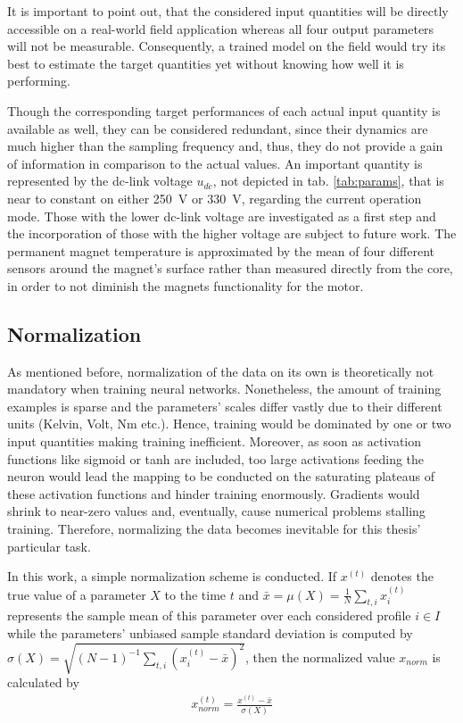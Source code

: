 It is important to point out, that the considered input quantities will be directly accessible on a real-world field application whereas all four output parameters will not be measurable.
Consequently, a trained model on the field would try its best to estimate the target quantities yet without knowing how well it is performing.

Though the corresponding target performances of each actual input quantity is available as well, they can be considered redundant, since their dynamics are much higher than the sampling frequency and, thus, they do not provide a gain of information in comparison to the actual values.
An important quantity is represented by the dc-link voltage $u_{dc}$, not depicted in tab. \ref{tab:params}, that is near to constant on either \SI{250}{\volt} or \SI{330}{\volt}, regarding the current operation mode.
Those with the lower dc-link voltage are investigated as a first step and the incorporation of those with the higher voltage are subject to future work.
The permanent magnet temperature is approximated by the mean of four different sensors around the magnet's surface rather than measured directly from the core, in order to not diminish the magnets functionality for the motor.


\subsection{Normalization}
As mentioned before, normalization of the data on its own is theoretically not mandatory when training neural networks.
Nonetheless, the amount of training examples is sparse and the parameters' scales differ vastly due to their different units (Kelvin, Volt, Nm etc.).
Hence, training would be dominated by one or two input quantities making training inefficient.
Moreover, as soon as activation functions like sigmoid or tanh are included, too large activations feeding the neuron would lead the mapping to be conducted on the saturating plateaus of these activation functions and hinder training enormously.
Gradients would shrink to near-zero values and, eventually, cause numerical problems stalling training.
Therefore, normalizing the data becomes inevitable for this thesis' particular task.

In this work, a simple normalization scheme is conducted.
If $x^{(t)}$ denotes the true value of a parameter $X$ to the time $t$ and $\bar{x} = \mu(X) = \frac{1}{N}\sum\nolimits_{t, i} x^{(t)}_i$ represents the sample mean of this parameter over each considered profile $i\in I$ while the parameters' unbiased sample standard deviation is computed by $\sigma(X)=\sqrt{(N-1)^{-1}\sum\nolimits_{t, i} (x^{(t)}_i - \bar{x})^2}$, then the normalized value $x_{norm}$ is calculated by  
\begin{align}
	x_{norm}^{(t)} = \frac{x^{(t)}-\bar{x}}{\sigma(X)}
\end{align}

